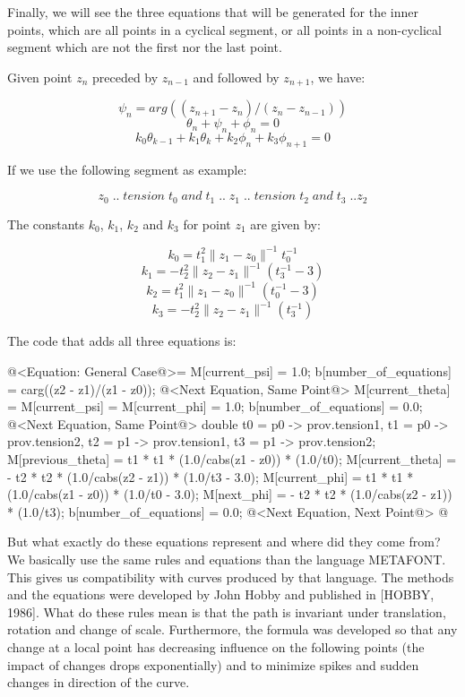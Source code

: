 Finally, we will see the three equations that will be generated for
the inner points, which are all points in a cyclical segment, or all
points in a non-cyclical segment which are not the first nor the last
point.

Given point $z_n$ preceded by $z_{n-1}$ and followed by $z_{n+1}$,
we have:

$$
\psi_n = arg((z_{n+1}-z_n)/(z_n-z_{n-1}))
$$
$$
\theta_n + \psi_n + \phi_n = 0
$$
$$
k_0\theta_{k-1} + k_1\theta_k + k_2\phi_n + k_3\phi_{n+1} = 0
$$

If we use the following segment as example:

$$
z_0\; ..\; tension\; t_0\; and\; t_1\; ..\; z_1\; ..\; tension\; t_2\; and\; t_3
\; .. z_2
$$

The constants $k_0$, $k_1$, $k_2$ and $k_3$ for point $z_1$ are given
by:

$$
k_0 = t_1^2\|z_1-z_0\|^{-1}t_0^{-1}
$$
$$
k_1 = - t_2^2\|z_2-z_1\|^{-1}(t_3^{-1}-3)
$$
$$
k_2 = t_1^2\|z_1-z_0\|^{-1}(t_0^{-1} - 3)
$$
$$
k_3 = - t_2^2\|z_2-z_1\|^{-1}(t_3^{-1})
$$

The code that adds all three equations is:

\iniciocodigo
@<Equation: General Case@>=
M[current_psi] = 1.0;
b[number_of_equations] = carg((z2 - z1)/(z1 - z0));
@<Next Equation, Same Point@>
M[current_theta] = M[current_psi] = M[current_phi] = 1.0;
b[number_of_equations] = 0.0;
@<Next Equation, Same Point@>
{
  double t0 = p0 -> prov.tension1, t1 = p0 -> prov.tension2,
         t2 = p1 -> prov.tension1, t3 = p1 -> prov.tension2;
  M[previous_theta] = t1 * t1 * (1.0/cabs(z1 - z0)) * (1.0/t0);
  M[current_theta] = - t2 * t2 * (1.0/cabs(z2 - z1)) * (1.0/t3 - 3.0);
  M[current_phi] = t1 * t1 * (1.0/cabs(z1 - z0)) * (1.0/t0 - 3.0);
  M[next_phi] = - t2 * t2 * (1.0/cabs(z2 - z1)) * (1.0/t3);
  b[number_of_equations] = 0.0;
  @<Next Equation, Next Point@>
}
@
\fimcodigo

But what exactly do these equations represent and where did they come
from? We basically use the same rules and equations than the language
METAFONT. This gives us compatibility with curves produced by that
language. The methods and the equations were developed by John Hobby
and published in [HOBBY, 1986]. What do these rules mean is that the
path is invariant under translation, rotation and change of
scale. Furthermore, the formula was developed so that any change at a
local point has decreasing influence on the following points (the
impact of changes drops exponentially) and to minimize spikes and
sudden changes in direction of the curve.


